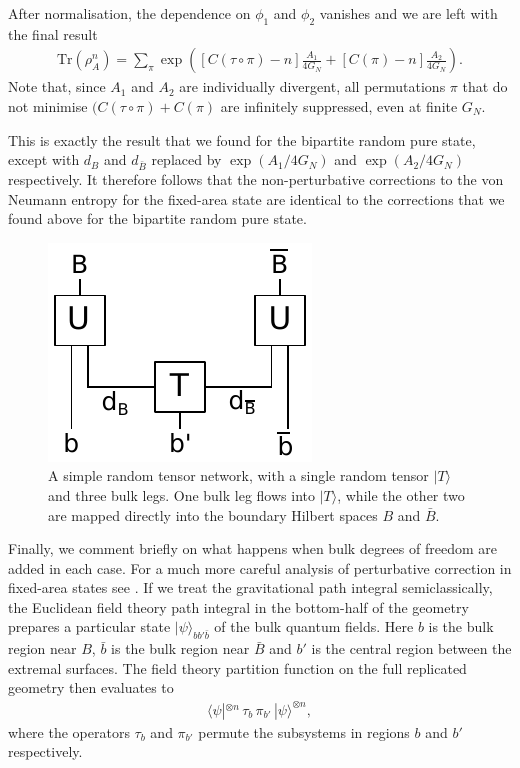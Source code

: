 \documentclass[11pt]{article}
\numberwithin{equation}{section}
\def\tr{\text{Tr}}
\begin{document}
After normalisation, the dependence on $\phi_1$ and $\phi_2$ vanishes and we are left with the final result
\begin{align}
\tr(\rho_A^n) = \sum_\pi \exp\left(\left[C(\tau \circ \pi) - n\right] \frac{A_1}{4 G_N} + \left[C(\pi) - n\right] \frac{A_2}{4 G_N}\right).
\end{align}
Note that, since $A_1$ and $A_2$ are individually divergent, all permutations $\pi$ that do not minimise $(C(\tau \circ \pi) + C(\pi)$ are infinitely suppressed, even at finite $G_N$.

This is exactly the result that we found for the bipartite random pure state, except with $d_B$ and $d_{\bar B}$ replaced by $\exp(A_1/4G_N)$ and $\exp(A_2/4G_N)$ respectively. It therefore follows that the non-perturbative corrections to the von Neumann entropy for the fixed-area state are identical to the corrections that we found above for the bipartite random pure state.
\begin{figure}[t]
\begin{center}
\includegraphics[width = .3\textwidth]{images/QC.pdf}
\caption{{\small A simple random tensor network, with a single random tensor $|T\rangle$ and three bulk legs. One bulk leg flows into $| T\rangle$, while the other two are mapped directly into the boundary Hilbert spaces $B$ and $\bar B$.}}\label{fig:bulklegsTN}
\end{center}
\end{figure}

Finally, we comment briefly on what happens when bulk degrees of freedom are added in each case. For a much more careful analysis of perturbative correction in fixed-area states see \cite{Dong:2019piw}. If we treat the gravitational path integral semiclassically, the Euclidean field theory path integral in the bottom-half of the geometry prepares a particular state $|\psi\rangle_{b b' \bar{b}}$ of the bulk quantum fields. Here $b$ is the bulk region near $B$, $\bar b$ is the bulk region near $\bar B$ and $b'$ is the central region between the extremal surfaces. The field theory partition function on the full replicated geometry then evaluates to
\begin{align} \label{eq:bulklegs}
\langle\psi|^{\otimes n}\, \tau_b\, \pi_{b'}\, |\psi\rangle^{\otimes n},
\end{align}
where the operators $\tau_b$ and $\pi_{b'}$ permute the subsystems in regions $b$ and $b'$ respectively.
\end{document}
